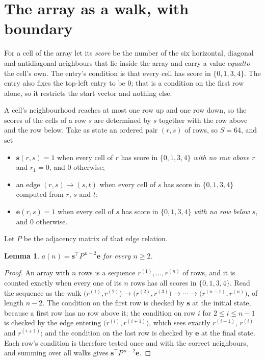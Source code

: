 \documentclass[11pt,a4paper]{article}
\theoremstyle{plain}
\newtheorem{lemma}[theorem]{Lemma}
\theoremstyle{definition}
\begin{document}
\section{The array as a walk, with boundary}

For a cell of the array let its \emph{score} be the number of the six horizontal, diagonal and antidiagonal neighbours that lie inside
the array and carry a value $equal to$ the cell's own. The entry's condition is that every cell
has score in $\{0,1,3,4\}$. The entry also fixes the top-left entry to be $0$; that is a condition on the first row alone, so it restricts the start vector and nothing else.

A cell's neighbourhood reaches at most one row up and one row down, so the scores of the
cells of a row $s$ are determined by $s$ together with the row above and the row below.
Take as state an ordered pair $(r,s)$ of rows, so $S=64$, and set
\begin{itemize}
\item $\mathbf{s}(r,s)=1$ when every cell of $r$ has score in $\{0,1,3,4\}$ \emph{with no row
above $r$} and $r_1=0$, and $0$ otherwise;
\item an edge $(r,s)\to(s,t)$ when every cell of $s$ has score in $\{0,1,3,4\}$ computed from
$r$, $s$ and $t$;
\item $\mathbf{e}(r,s)=1$ when every cell of $s$ has score in $\{0,1,3,4\}$ \emph{with no row
below $s$}, and $0$ otherwise.
\end{itemize}
Let $P$ be the adjacency matrix of that edge relation.

\begin{lemma}\label{lem:walk}
$a(n)=\mathbf{s}^{\!\top}P^{\,n-2}\mathbf{e}$ for every $n\ge2$.
\end{lemma}

\begin{proof}
An array with $n$ rows is a sequence $r^{(1)},\dots,r^{(n)}$ of rows, and it is counted
exactly when every one of its $n$ rows has all scores in $\{0,1,3,4\}$. Read the sequence as the
walk $\bigl(r^{(1)},r^{(2)}\bigr)\to\bigl(r^{(2)},r^{(3)}\bigr)\to\cdots\to
\bigl(r^{(n-1)},r^{(n)}\bigr)$, of length $n-2$. The condition on the first row is
checked by $\mathbf{s}$ at the initial state, because a first row has no row above it; the
condition on row $i$ for $2\le i\le n-1$ is checked by the edge entering
$\bigl(r^{(i)},r^{(i+1)}\bigr)$, which sees exactly $r^{(i-1)}$, $r^{(i)}$ and
$r^{(i+1)}$; and the condition on the last row is checked by $\mathbf{e}$ at the final
state. Each row's condition is therefore tested once and with the correct neighbours, and
summing over all walks gives $\mathbf{s}^{\!\top}P^{\,n-2}\mathbf{e}$.
\end{proof}
\end{document}
